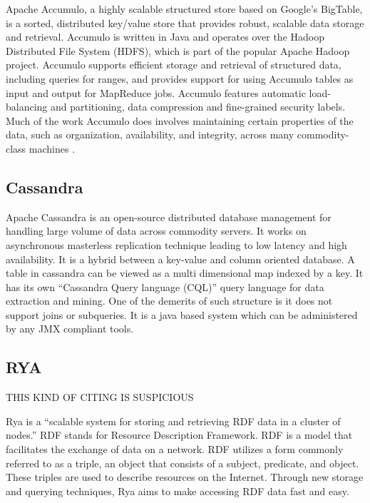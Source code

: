      Apache Accumulo, a highly scalable structured store based on
     Google’s BigTable, is a sorted, distributed key/value store that
     provides robust, scalable data storage and retrieval. Accumulo is
     written in Java and operates over the Hadoop Distributed File
     System (HDFS), which is part of the popular Apache Hadoop
     project. Accumulo supports efficient storage and retrieval of
     structured data, including queries for ranges, and provides
     support for using Accumulo tables as input and output for
     MapReduce jobs.
     Accumulo features automatic load-balancing and
     partitioning, data compression and fine-grained security
     labels. Much of the work Accumulo does involves maintaining
     certain properties of the data, such as organization,
     availability, and integrity, across many commodity-class
     machines \cite{apache-accumulo}.

\subsection{Cassandra}

     Apache Cassandra \cite{www-cassandra} is an open-source
     distributed database management for handling large volume of
     data across commodity servers. It works on asynchronous
     masterless replication technique leading to low latency and high
     availability. It is a hybrid between a key-value and column
     oriented database. A table in cassandra can be viewed as a multi
     dimensional map indexed by a key. It has its own ``Cassandra Query
     language (CQL)'' query language for data extraction and
     mining. One of the demerits of such structure is it does not
     support joins or subqueries. It is a java based system which can
     be administered by any JMX compliant tools.

\subsection{RYA \cv}

     THIS KIND OF CITING IS SUSPICIOUS

     Rya is a ``scalable system for storing and retrieving RDF data in
     a cluster of nodes.'' \cite{Punnoose} RDF stands for Resource
     Description Framework. \cite{Punnoose} RDF is a model that
     facilitates the exchange of data on a network. \cite{w3} RDF
     utilizes a form commonly referred to as a triple, an object that
     consists of a subject, predicate, and object. \cite{Punnoose}
     These triples are used to describe resources on the
     Internet. \cite{Punnoose} Through new storage and querying
     techniques, Rya aims to make accessing RDF data fast and
     easy. \cite{apacherya}
     

